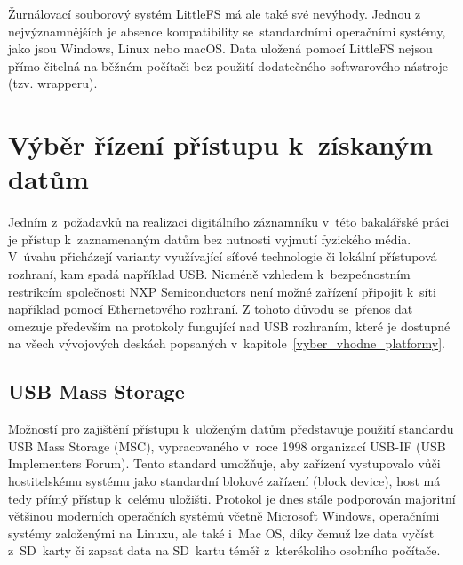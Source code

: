 Žurnálovací souborový systém LittleFS má ale také své nevýhody. Jednou z nejvýznamnějších je absence kompatibility se~standardními operačními systémy, jako jsou Windows, Linux nebo macOS. Data uložená pomocí LittleFS nejsou přímo čitelná na běžném počítači bez použití dodatečného softwarového nástroje (tzv. wrapperu).~\cite{cnx_software_little_fs}



\section{Výběr řízení přístupu k~získaným datům}
\label{vyber_rizeni_pristupu_k_ziskanym_datum}
Jedním z~požadavků na realizaci digitálního záznamníku v~této bakalářské práci je přístup k~zaznamenaným datům bez nutnosti vyjmutí fyzického média. V~úvahu přicházejí varianty využívající síťové technologie či lokální přístupová rozhraní, kam spadá například USB. Nicméně vzhledem k~bezpečnostním restrikcím společnosti NXP Semiconductors není možné zařízení připojit k~síti například pomocí Ethernetového rozhraní. Z tohoto důvodu se~přenos dat omezuje především na protokoly fungující nad USB rozhraním, které je dostupné na všech vývojových deskách popsaných v~kapitole~\ref{vyber_vhodne_platformy}.


\subsection{USB Mass Storage}
\label{usb_mass_storage}
Možností pro zajištění přístupu k~uloženým datům představuje použití standardu USB Mass Storage (MSC), vypracovaného v~roce 1998 organizací USB-IF (USB Implementers Forum). Tento standard umožňuje, aby zařízení vystupovalo vůči hostitelskému systému jako standardní blokové zařízení (block device), host má tedy přímý přístup k~celému uložišti. Protokol je dnes stále podporován majoritní většinou moderních operačních systémů včetně Microsoft Windows, operačními systémy založenými na Linuxu, ale také i~Mac OS, díky čemuž lze data vyčíst z~SD~karty či zapsat data na SD~kartu téměř z~kterékoliho osobního počítače.~\cite{usb_standard_ufi, silicon_labs_mass_storage_protocol}

